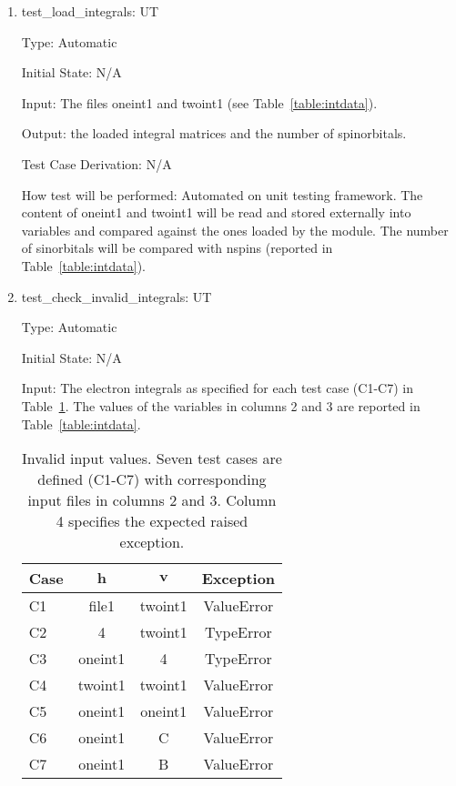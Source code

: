 \documentclass[12pt, titlepage]{article}
\newcounter{utnum} %
\begin{document}
\begin{enumerate}
	
	
	\item{test\_load\_integrals:  UT\theutnum 
		\label{UT3}}
	
	Type: Automatic
	
	Initial State: N/A
	
	Input: The files oneint1 and twoint1 (see Table~\ref{table:intdata}).
	
	Output: the loaded integral matrices and the number of spinorbitals.
	
	Test Case Derivation: N/A
	
	How test will be performed:  Automated on unit testing framework. The 
	content of oneint1 and twoint1 will be read and stored externally into 
	variables and compared against the ones loaded by the module. The number of 
	sinorbitals will be compared with nspins (reported in 
	Table~\ref{table:intdata}).
	
	\item{test\_check\_invalid\_integrals:  UT\theutnum 
		\label{UT4}}
	
	Type: Automatic
	
	Initial State: N/A
	
	Input: The electron integrals as specified for each test case (C1-C7) in 
	Table~\ref{table:wrongints}. The values of the variables in columns 2 and 3 
	are reported in Table~\ref{table:intdata}.
	\begin{table}[h!]
		\centering
		\begin{tabular}{lccc}
			Case & $\mathbf{h}$ & $\mathbf{v}$ & Exception  \\ \toprule
			C1   &    file1     &   twoint1    & ValueError \\
			C2   &      4       &   twoint1    & TypeError  \\
			C3   &   oneint1    &      4       & TypeError  \\
			C4   &   twoint1    &   twoint1    & ValueError \\
			C5   &   oneint1    &   oneint1    & ValueError \\
			C6   &   oneint1    &      C       & ValueError \\
			C7   &   oneint1    &      B       & ValueError \\ \bottomrule
		\end{tabular}
		\caption{Invalid input values. Seven test cases are defined (C1-C7) 
		with corresponding input files in columns 2 and 3. Column 4 
			specifies the expected raised exception.}
		\label{table:wrongints}
	\end{table}	


\end{enumerate}
\end{document}

